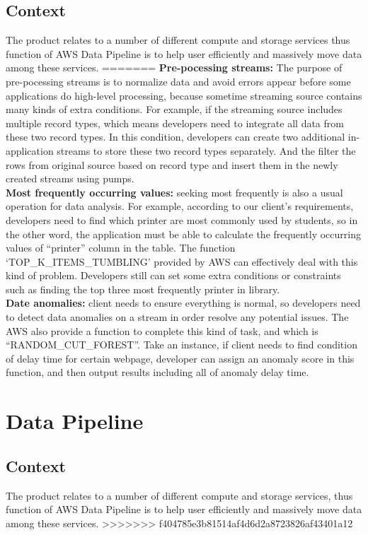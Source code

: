 	\subsection{Context}
    The product relates to a number of different compute and storage services thus function of AWS Data Pipeline is to help user efficiently and massively move data among these services.
=======
	\noindent \textbf{Pre-pocessing streams:} The purpose of pre-pocessing streams is to normalize data and avoid errors appear before some applications do high-level processing, because sometime streaming source contains many kinds of extra conditions. For example, if the streaming source includes multiple record types, which means developers need to integrate all data from these two record types. In this condition, developers can create two additional in-application streams to store these two record types separately. And the filter the rows from original source based on record type and insert them in the newly created streams using pumps\cite{z4}.\\

	\noindent \textbf{Most frequently occurring values:} seeking most frequently is also a usual operation for data analysis. For example, according to our client’s requirements, developers need to find which printer are most commonly used by students, so in the other word, the application must be able to calculate the frequently occurring values of “printer” column in the table. The function ‘TOP\_K\_ITEMS\_TUMBLING’ provided by AWS can effectively deal with this kind of problem. Developers still can set some extra conditions or constraints such as finding the top three most frequently printer in library.\\

	\noindent \textbf{Date anomalies:} client needs to ensure everything is normal, so developers need to detect data anomalies on a stream in order resolve any potential issues. The AWS also provide a function to complete this kind of task, and which is “RANDOM\_CUT\_FOREST”. Take an instance, if client needs to find condition of delay time for certain webpage, developer can assign an anomaly score in this function, and then output results including all of anomaly delay time.
       
\section{Data Pipeline}
	\subsection{Context}
    The product relates to a number of different compute and storage services, thus function of AWS Data Pipeline is to help user efficiently and massively move data among these services.
>>>>>>> f404785e3b81514af4d6d2a8723826af43401a12
     
